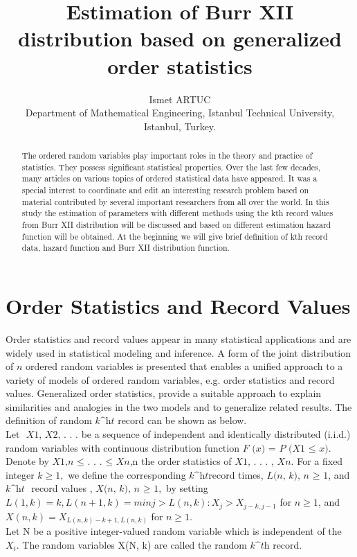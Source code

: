 \documentclass[a4paper, 11pt]{article}
\numberwithin{equation}{section}
\begin{document}
\title{\bf Estimation of Burr XII distribution based on generalized order statistics}
\author{ Ismet ARTUC \\
\small {Department of Mathematical Engineering, Istanbul  Technical University, Istanbul, Turkey.} \\ }
\date{}
\maketitle
\begin{abstract}
The ordered random variables play important roles in the theory and practice of statistics. They possess significant statistical properties. Over the last few decades, many articles on various topics of ordered statistical data have appeared. It was a special interest to coordinate and edit an interesting research problem based on material contributed by several important researchers from all over the world. In this study the estimation of parameters with different methods using the kth record values from Burr XII distribution will be discussed and based on different estimation hazard function will be obtained. At the beginning we will give brief definition of kth record data, hazard function and Burr XII distribution function.  
\end{abstract}

\section{Order Statistics and Record Values}
 Order statistics and record values appear in many statistical applications and are widely used in statistical modeling and inference. A form of the joint distribution of $ \textit{n} $ ordered random variables is presented that enables a unified approach to a variety of models of ordered random variables, e.g. order statistics and record values. Generalized order statistics, provide a suitable approach to explain similarities and analogies in the two models and to generalize related results. The definition of random  $ \textit{k^{ht}} $ record  can  be  shown  as  below.\\
 
 Let $\textit{ X{1}, X{2}, . . .}$ be a sequence of independent and identically distributed (i.i.d.) random variables with continuous distribution function  $\textit{F (x) = P (X{1} ≤ x)}$. Denote by  $\textit{X{1,n} ≤ . . . ≤ X{n}}$,n the order statistics of   $\textit{X{1}, . . . , X{n}}.$ For a fixed integer  $\textit{k} ≥ 1,$ we define the corresponding  $\textit{k^{ht}}$record times, $\textit{{L(n, k), n ≥ 1}}$, and  $\textit{k^{ht} }$record values ,  $\textit{{X(n, k), n ≥ 1}},$ by setting
$  
L(1, k) = k,	L(n + 1, k) = min{j > L(n, k) : X_{j} > X_{j-k,j-1}}$  	for $n ≥ 1 $, and
$ X(n, k) = X_{L(n,k)−k+1,L(n,k)} $	for	  $n ≥ 1.$\\
Let N be a positive integer-valued random variable which is independent of the $ X_{i}. $ The random variables X(N, k) are called the random $\textit{k^{th}} $ record.
\end{document}
